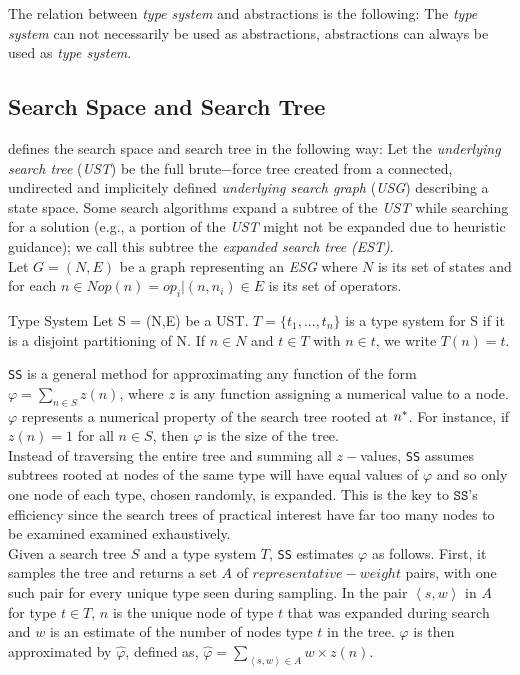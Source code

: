The relation between \textit{type system} and abstractions is the following: The \textit{type system} can not necessarily be used as abstractions, abstractions can always be used as \textit{type system}.

\subsection{Search Space and Search Tree}
\cite{lelis2013predicting} defines the search space and search tree in the following way: Let the \textit{underlying search tree} (\textit{UST}) be the full brute$-$force tree created from a connected, undirected and implicitely defined \textit{underlying search graph} (\textit{USG}) describing a state space. Some search algorithms expand a subtree of the \textit{UST} while searching for a solution (\textsf{e.g.,} a portion of the \textit{UST} might not be expanded due to heuristic guidance); we call this subtree the \textit{expanded search tree} \textit{(EST)}.\\

Let $G = (N,E)$ be a graph representing an \textit{ESG} where $N$ is its set of states and for each $n \in N op(n) = {op_{i}|(n, n_i) \in E}$ is its set of operators.

\theoremstyle{definition}
\begin{definition}{Type System}
Let S = (N,E) be a UST. $T = \{t_{1},...,t_{n} \}$ is a type system for S if it is a disjoint partitioning of N. If $n \in N$ and $t \in T$ with $n \in t$, we write $T(n) = t$.
\end{definition}

\texttt{SS} is a general method for approximating any function of the form $\varphi = \sum_{n \in S}z(n)$, where $z$ is any function assigning a numerical value to a node.  $\varphi$ represents a numerical property of the search tree rooted at $n\sp{*}$. For instance, if $z(n)=1$ for all $n \in S$, then $\varphi$ is the size of the tree.\\

Instead of traversing the entire tree and summing all $z-$values, \texttt{SS} assumes subtrees rooted at nodes of the same type will have equal values of $\varphi$ and so only one node of each type, chosen randomly, is expanded. This is the key to $\texttt{SS}$'s efficiency since the search trees of practical interest have far too many nodes to be examined examined exhaustively.\\

Given a search tree $S$ and a type system $T$, \texttt{SS} estimates $\varphi$ as follows. First, it samples the tree and returns a set $A$ of $representative-weight$ pairs, with one such pair for every unique type seen during sampling. In the pair $\left\langle s,w \right\rangle$ in $A$ for type $t \in T$, $n$ is the unique node of type $t$ that was expanded during search and $w$ is an estimate of the number of nodes type $t$ in the tree. $\varphi$ is then approximated by $\hat{\varphi}$, defined as, $\hat{\varphi} =  \sum_{\left\langle s,w \right\rangle \in A}w \times z(n)$.\\

